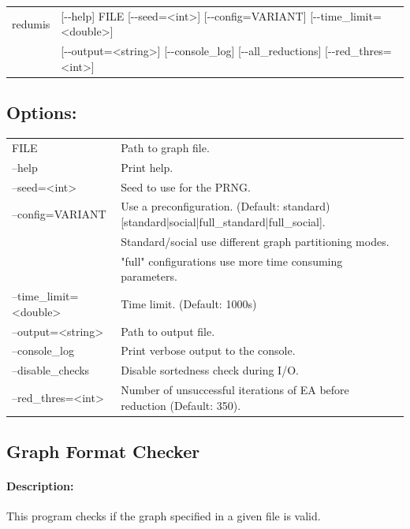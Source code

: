 \documentclass[11pt]{article}
\begin{document}
\begin{tabular}{ll}
redumis &   [-{}-help] FILE [-{}-seed=<int>] [-{}-config=VARIANT]  [-{}-time\_limit=<double>] \\
& [-{}-output=<string>] [-{}-console\_log] [-{}-all\_reductions] [-{}-red\_thres=<int>]

\end{tabular}
                          
\subsection*{Options:\\}

\begin{tabularx}{\textwidth}{lX}
  FILE                          & Path to graph file.\\
  --help                        & Print help. \\
  --seed=<int>                  & Seed to use for the PRNG.\\
  --config=VARIANT              & Use a preconfiguration. (Default: standard) [standard|social|full\_standard|full\_social].\\
                                & Standard/social use different graph partitioning modes. \\ 
                                & "full" configurations use more time consuming parameters.\\
  --time\_limit=<double>        & Time limit. (Default: 1000s)\\
  --output=<string>             & Path to output file.\\
  --console\_log                & Print verbose output to the console.\\
  --disable\_checks             & Disable sortedness check during I/O.\\
  --red\_thres=<int>            & Number of unsuccessful iterations of EA before reduction (Default: 350).\\
\end{tabularx}


\subsection{Graph Format Checker}
\paragraph*{Description:} This program checks if the graph specified in a given file is valid. 
\end{document}
